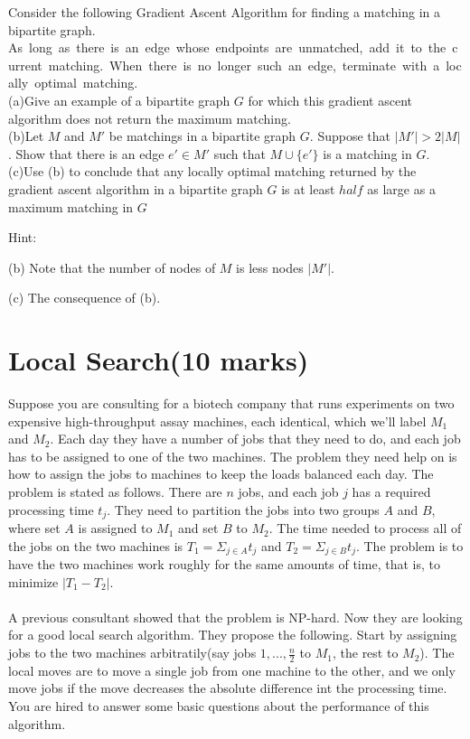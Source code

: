 \documentclass[a4paper,11pt]{article}
\begin{document}
Consider the following Gradient Ascent Algorithm for finding a matching in a bipartite graph.\\
			 As\ long\ as\ there\ is\ an\ edge\ whose\ endpoints\ are\ unmatched,\ add\ it\ to\ the\ current\ matching.\ When\ there\ is\ no\ longer\ such\ an\ edge,\ terminate\ with\ a\ locally\ optimal\ matching.\\
			 (a)Give an example of a bipartite graph $G$ for which this gradient ascent algorithm does not return the maximum matching.\\
			 (b)Let $M$ and $M'$ be matchings in a bipartite graph $G$. Suppose that $|M'|>2|M|$. Show that there is an edge $e'\in M'$ such that $M\cup \{ e'\} $ is a matching in $G$.\\
			 (c)Use (b) to conclude that any locally optimal matching returned by the gradient ascent algorithm in a bipartite graph $G$ is at least $half$ as large as a maximum matching in $G$

Hint: 


(b) Note that the number of nodes of $M$ is less nodes $|M'|$. 

(c) The consequence of (b). 

\section{Local Search(10 marks)}

Suppose you are consulting for a biotech company that runs experiments on two expensive high-throughput assay machines, each identical, which we'll label $M_1$ and $M_2$. Each day they have a number of jobs that they need to do, and each job has to be assigned to one of the two machines. The problem they need help on is how to assign the jobs to machines to keep the loads balanced each day. The problem is stated as follows. There are $n$ jobs, and each job $j$ has a required processing time $t_j$. They need to partition the jobs into two groups $A$ and $B$, where set $A$ is assigned to $M_1$ and set $B$ to $M_2$. The time needed to process all of the jobs on the two machines is $T_1=\Sigma _{j\in A}t_j$ and $T_2=\Sigma _{j\in B}t_j$. The problem is to have the two machines work roughly for the same amounts of time, that is, to minimize $|T_1-T_2|$.\\\\

		A previous consultant showed that the problem is NP-hard. Now they are looking for a good local search algorithm. They propose the following. Start by assigning jobs to the two machines arbitratily(say jobs $1,...,\frac{n}{2}$ to $M_1$, the rest to $M_2$). The local moves are to move a single job from one machine to the other, and we only move jobs if the move decreases the absolute difference int the processing time. You are hired to answer some basic questions about the performance of this algorithm.\\\\
\end{document}
